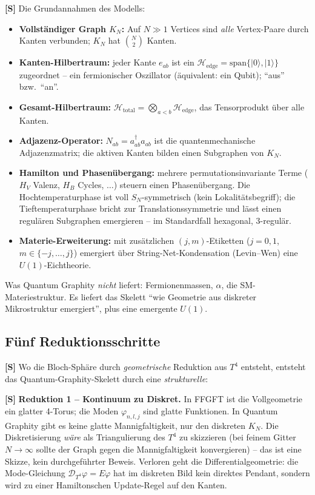 \textbf{[S]} Die Grundannahmen des Modells:
\begin{itemize}[leftmargin=2em,itemsep=2pt,topsep=2pt]
  \item \textbf{Vollständiger Graph $K_N$:} Auf $N\gg1$ Vertices sind \emph{alle}
    Vertex-Paare durch Kanten verbunden; $K_N$ hat $\binom{N}{2}$ Kanten.
  \item \textbf{Kanten-Hilbertraum:} jeder Kante $e_{ab}$ ist ein
    $\mathcal H_{\text{edge}} = \mathrm{span}\{|0\rangle,|1\rangle\}$ zugeordnet
    -- ein fermionischer Oszillator (äquivalent: ein Qubit); \enquote{aus} bzw.\
    \enquote{an}.
  \item \textbf{Gesamt-Hilbertraum:}
    $\mathcal H_{\text{total}} = \bigotimes_{a<b}\mathcal H_{\text{edge}}$, das
    Tensorprodukt über alle Kanten.
  \item \textbf{Adjazenz-Operator:} $N_{ab} = a^\dagger_{ab}a_{ab}$ ist die
    quantenmechanische Adjazenzmatrix; die aktiven Kanten bilden einen
    Subgraphen von $K_N$.
  \item \textbf{Hamilton und Phasenübergang:} mehrere permutationsinvariante
    Terme ($H_V$ Valenz, $H_B$ Cycles, $\dots$) steuern einen Phasenübergang. Die
    Hochtemperaturphase ist voll $S_N$-symmetrisch (kein Lokalitätsbegriff); die
    Tieftemperaturphase bricht zur Translationssymmetrie und lässt einen
    regulären Subgraphen emergieren -- im Standardfall hexagonal, $3$-regulär.
  \item \textbf{Materie-Erweiterung:} mit zusätzlichen $(j,m)$-Etiketten
    ($j=0,1$, $m\in\{-j,\dots,j\}$) emergiert über String-Net-Kondensation
    (Levin--Wen) eine $U(1)$-Eichtheorie.
\end{itemize}
Was Quantum Graphity \emph{nicht} liefert: Fermionenmassen, $\alpha$, die
SM-Materiestruktur. Es liefert das Skelett \enquote{wie Geometrie aus diskreter
Mikrostruktur emergiert}, plus eine emergente $U(1)$.

\subsection*{Fünf Reduktionsschritte}

\textbf{[S]} Wo die Bloch-Sphäre durch \emph{geometrische} Reduktion aus $T^4$
entsteht, entsteht das Quantum-Graphity-Skelett durch eine \emph{strukturelle}:

\textbf{[S]} \textbf{Reduktion 1 -- Kontinuum zu Diskret.} In FFGFT ist die
Vollgeometrie ein glatter 4-Torus; die Moden $\varphi_{n,l,j}$ sind glatte
Funktionen. In Quantum Graphity gibt es keine glatte Mannigfaltigkeit, nur den
diskreten $K_N$. Die Diskretisierung \emph{wäre} als Triangulierung des $T^4$ zu
skizzieren (bei feinem Gitter $N\to\infty$ sollte der Graph gegen die
Mannigfaltigkeit konvergieren) -- das ist eine Skizze, kein durchgeführter
Beweis. Verloren geht die Differentialgeometrie: die Mode-Gleichung
$\mathcal D_{T^4}\varphi = E\varphi$ hat im diskreten Bild kein direktes Pendant,
sondern wird zu einer Hamiltonschen Update-Regel auf den Kanten.


